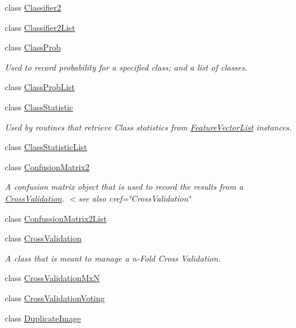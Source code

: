 \begin{DoxyCompactItemize}
class \hyperlink{class_k_k_m_l_l_1_1_classifier2}{Classifier2}
\item 
class \hyperlink{class_k_k_m_l_l_1_1_classifier2_list}{Classifier2\+List}
\item 
class \hyperlink{class_k_k_m_l_l_1_1_class_prob}{Class\+Prob}
\begin{DoxyCompactList}\small\item\em Used to record probability for a specified class; and a list of classes. \end{DoxyCompactList}\item 
class \hyperlink{class_k_k_m_l_l_1_1_class_prob_list}{Class\+Prob\+List}
\item 
class \hyperlink{class_k_k_m_l_l_1_1_class_statistic}{Class\+Statistic}
\begin{DoxyCompactList}\small\item\em Used by routines that retrieve Class statistics from \hyperlink{class_k_k_m_l_l_1_1_feature_vector_list}{Feature\+Vector\+List} instances. \end{DoxyCompactList}\item 
class \hyperlink{class_k_k_m_l_l_1_1_class_statistic_list}{Class\+Statistic\+List}
\item 
class \hyperlink{class_k_k_m_l_l_1_1_confusion_matrix2}{Confusion\+Matrix2}
\begin{DoxyCompactList}\small\item\em A confusion matrix object that is used to record the results from a \hyperlink{class_k_k_m_l_l_1_1_cross_validation}{Cross\+Validation}. $<$see also cref=\char`\"{}\+Cross\+Validation\char`\"{} \end{DoxyCompactList}\item 
class \hyperlink{class_k_k_m_l_l_1_1_confussion_matrix2_list}{Confussion\+Matrix2\+List}
\item 
class \hyperlink{class_k_k_m_l_l_1_1_cross_validation}{Cross\+Validation}
\begin{DoxyCompactList}\small\item\em A class that is meant to manage a n-\/\+Fold Cross Validation. \end{DoxyCompactList}\item 
class \hyperlink{class_k_k_m_l_l_1_1_cross_validation_mx_n}{Cross\+Validation\+MxN}
\item 
class \hyperlink{class_k_k_m_l_l_1_1_cross_validation_voting}{Cross\+Validation\+Voting}
\item 
class \hyperlink{class_k_k_m_l_l_1_1_duplicate_image}{Duplicate\+Image}

\end{DoxyCompactItemize}
